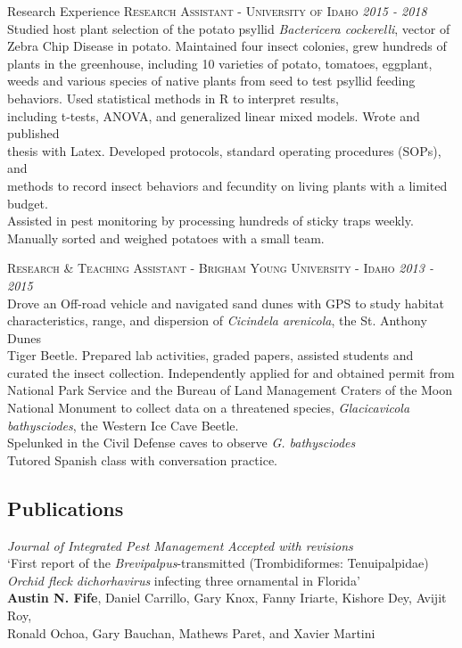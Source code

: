 \documentclass{resume} %
\begin{document}
\begin{rSection}{Research Experience}
\textsc{Research Assistant - University of Idaho} \hfill {\em \textit{2015 - 2018}}\\
Studied host plant selection of the potato psyllid \textit{Bactericera cockerelli}, vector of Zebra Chip Disease in potato. Maintained four insect colonies, grew hundreds of plants in the greenhouse, including 10 varieties of potato, tomatoes, eggplant, weeds and various species of native plants from seed to test psyllid feeding behaviors. Used statistical methods in R to interpret results,\\
including t-tests, ANOVA, and generalized linear mixed models. Wrote and published\\ thesis with Latex. Developed protocols, standard operating procedures (SOPs), and\\ methods to record insect behaviors and fecundity on living plants with a limited budget.\\
Assisted in pest monitoring by processing hundreds of sticky traps weekly. Manually sorted and weighed potatoes with a small team.\\ \hfill

\textsc{Research \& Teaching Assistant - Brigham Young University - Idaho} \hfill {\em \textit{2013 - 2015}}\\
Drove an Off-road vehicle and navigated sand dunes with GPS to study habitat\\
characteristics, range, and dispersion of \textit{Cicindela arenicola}, the St. Anthony Dunes\\ Tiger Beetle. Prepared lab activities, graded papers, assisted students and curated the insect collection. Independently applied for and obtained permit from National Park Service and the Bureau of Land Management Craters of the Moon National Monument to collect data on a threatened species, \textit{Glacicavicola bathysciodes}, the Western Ice Cave Beetle.\\
Spelunked in the Civil Defense caves to observe \textit{G. bathysciodes}\\
Tutored Spanish class with conversation practice.\\ \hfill


\subsection*{Publications}
\textit{Journal of Integrated Pest Management} \hfill {\em \textit{Accepted with revisions}}\\
`First report of the \textit{Brevipalpus}-transmitted (Trombidiformes: Tenuipalpidae)\\
\textit{Orchid fleck dichorhavirus} infecting three ornamental in Florida'\\
\textbf{Austin N. Fife}, Daniel Carrillo, Gary Knox, Fanny Iriarte, Kishore Dey, Avijit Roy,\\
 Ronald Ochoa, Gary Bauchan, Mathews Paret, and Xavier Martini\\ \hfill
 

\end{rSection}
\end{document}
